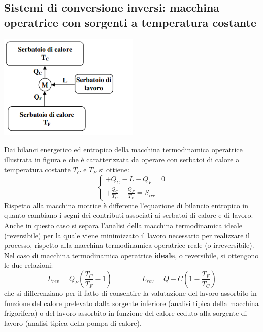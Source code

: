 \subsection{Sistemi di conversione inversi: macchina operatrice con sorgenti a temperatura costante}
\begin{center}
    \includegraphics[height=5cm]{../NOTE SUGLI ESERCIZI/img5.PNG}
\end{center}
Dai bilanci energetico ed entropico della macchina termodinamica operatrice illustrata in
figura e che è caratterizzata da operare con serbatoi di calore a temperatura costante $T_C$ e $T_F$ si
ottiene:
\[
    \begin{cases}
        +Q_C - L - Q_F = 0\\
        + \frac{Q_C}{T_C} - \frac{Q_F}{T_F} = S_{irr}
    \end{cases}
\]
Rispetto alla macchina motrice è differente l’equazione di bilancio entropico in quanto
cambiano i segni dei contributi associati ai serbatoi di calore e di lavoro.\newline
\newline
Anche in questo caso si separa l’analisi della macchina termodinamica ideale (reversibile) per
la quale viene minimizzato il lavoro necessario per realizzare il processo, rispetto alla
macchina termodinamica operatrice reale (o irreversibile). \newline
\newline
Nel caso di macchina termodinamica operatrice \textbf{ideale}, o reversibile, si ottengono le due
relazioni: 
\[
    L_{rev} = Q_F\left(\frac{T_C}{T_F}-1\right) \;\;\;\;\;\;\;\;\;\;\;\;\;\;\; L_{rev} = Q-C \left(1- \frac{T_F}{T_C}\right)
\]
che si differenziano per il fatto di consentire la valutazione del lavoro assorbito in funzione
del calore prelevato dalla sorgente inferiore (analisi tipica della macchina frigorifera) o del
lavoro assorbito in funzione del calore ceduto alla sorgente di lavoro (analisi tipica della
pompa di calore).
\newline
\newline
